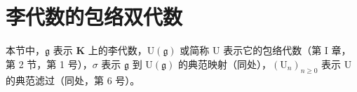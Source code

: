 \section{李代数的包络双代数}

本节中，\(\mathfrak{g}\) 表示 \(\mathbf{K}\) 上的李代数，\(\mathrm{U}(\mathfrak{g})\) 或简称 \(\mathrm{U}\) 表示它的包络代数（第 I 章，第 2 节，第 1 号），\(\sigma\) 表示 \(\mathfrak{g}\) 到 \(\mathrm{U}(\mathfrak{g})\) 的典范映射（同处），\((\mathrm{U}_n)_{n\geqslant 0}\) 表示 \(\mathrm{U}\) 的典范滤过（同处，第 6 号）。

